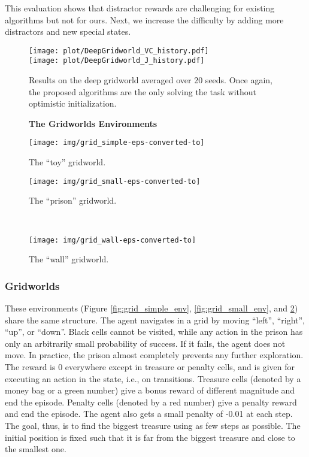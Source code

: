 \documentclass{article}
\begin{document}
This evaluation shows that distractor rewards are challenging for existing algorithms but not for ours. Next, we increase the difficulty by adding more distractors and new special states.

\begin{figure}[t]
	\centering
	\texttt{[image: plot/DeepGridworld\_VC\_history.pdf]}\\
	\texttt{[image: plot/DeepGridworld\_J\_history.pdf]}
	\caption{\label{fig:deep_grid_res}Results on the deep gridworld averaged over 20 seeds. Once again, the proposed algorithms are the only solving the task without optimistic initialization.}
\end{figure}


\clearpage

\begin{figure}[h]
	\centering
	\textbf{The Gridworlds Environments}
	\\[1em]
	\begin{minipage}[t]{.49\textwidth}
		\centering
		\texttt{[image: img/grid\_simple-eps-converted-to]}
		\caption{\label{fig:grid_simple_env}The ``toy'' gridworld.}
	\end{minipage}\hfill
	\begin{minipage}[t]{.49\textwidth}
		\centering
		\texttt{[image: img/grid\_small-eps-converted-to]}
		\caption{\label{fig:grid_small_env}The ``prison'' gridworld.}
	\end{minipage}\\[1em]
	\begin{minipage}[t]{.99\textwidth}
		\centering
		\texttt{[image: img/grid\_wall-eps-converted-to]}
		\caption{\label{fig:grid_wall_env}The ``wall'' gridworld.}
	\end{minipage}
\end{figure}

\clearpage

\subsubsection{Gridworlds}
\label{sssec:grids}
These environments (Figure \ref{fig:grid_simple_env}, \ref{fig:grid_small_env}, and \ref{fig:grid_wall_env}) share the same structure. The agent navigates in a grid by moving ``left'', ``right'', ``up'', or ``down''. 
Black cells cannot be visited, while any action in the prison has only an arbitrarily small probability of success. If it fails, the agent does not move. In practice, the prison almost completely prevents any further exploration. 
The reward is 0 everywhere except in treasure or penalty cells, and is given for executing an action in the state, i.e., on transitions.
Treasure cells (denoted by a money bag or a green number) give a bonus reward of different magnitude and end the episode. Penalty cells (denoted by a red number) give a penalty reward and end the episode. The agent also gets a small penalty of -0.01 at each step. The goal, thus, is to find the biggest treasure using as few steps as possible. 
The initial position is fixed such that it is far from the biggest treasure and close to the smallest one.
\end{document}
